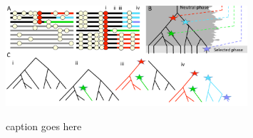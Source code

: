\documentclass[a4paper,10pt]{article}
\newcommand{\jb}[1]{{\it\color{blue} (#1)} }
\begin{document}

\begin{figure}
	\includegraphics[width = 0.8\textwidth]{../Paper_Figures/Cartoon_of_soft_sweeps.pdf} \label{cartoon_fig_1}
	\caption{caption goes here}
\end{figure}
\end{document}
